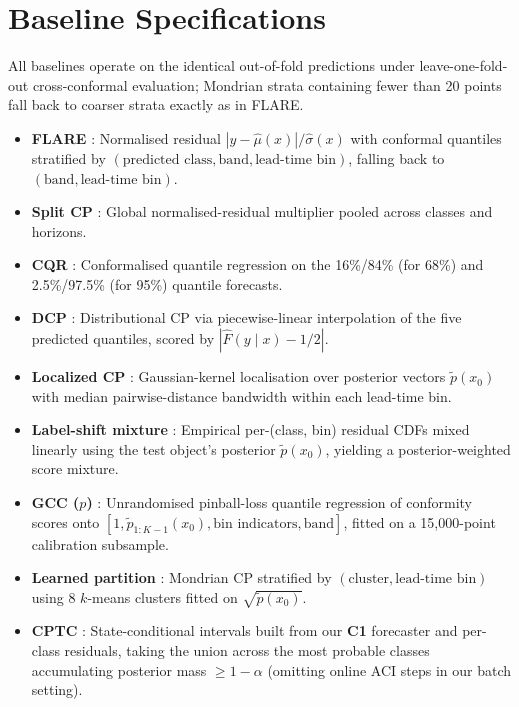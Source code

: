\section{Baseline Specifications}
\label{app:baselines}
All baselines operate on the identical out-of-fold predictions under leave-one-fold-out cross-conformal evaluation; Mondrian strata containing fewer than 20 points fall back to coarser strata exactly as in FLARE.
\begin{itemize}
\item \textbf{FLARE} \citep{sasli2026forecast,sasli2026flare}: Normalised residual $|y-\hat\mu(x)|/\hat\sigma(x)$ with conformal quantiles stratified by $(\text{predicted class},\text{band},\text{lead-time bin})$, falling back to $(\text{band},\text{lead-time bin})$.
\item \textbf{Split CP} \citep{lei2018distribution}: Global normalised-residual multiplier pooled across classes and horizons.
\item \textbf{CQR} \citep{romano2019conformalized}: Conformalised quantile regression on the 16\%/84\% (for 68\%) and 2.5\%/97.5\% (for 95\%) quantile forecasts.
\item \textbf{DCP} \citep{chernozhukov2021distributional}: Distributional CP via piecewise-linear interpolation of the five predicted quantiles, scored by $|\hat F(y\mid x)-1/2|$.
\item \textbf{Localized CP} \citep{guan2023localized}: Gaussian-kernel localisation over posterior vectors $\tilde p(x_0)$ with median pairwise-distance bandwidth within each lead-time bin.
\item \textbf{Label-shift mixture} \citep{podkopaev2021distribution}: Empirical per-(class, bin) residual CDFs mixed linearly using the test object's posterior $\tilde p(x_0)$, yielding a posterior-weighted score mixture.
\item \textbf{GCC ($p$)} \citep{gibbs2025conformal}: Unrandomised pinball-loss quantile regression of conformity scores onto $[1,\tilde p_{1:K-1}(x_0),\text{bin indicators},\text{band}]$, fitted on a 15,000-point calibration subsample.
\item \textbf{Learned partition} \citep{kiyani2024conformal}: Mondrian CP stratified by $(\text{cluster},\text{lead-time bin})$ using 8 $k$-means clusters fitted on $\sqrt{\tilde p(x_0)}$.
\item \textbf{CPTC} \citep{sun2025conformal}: State-conditional intervals built from our \textbf{C1} forecaster and per-class residuals, taking the union across the most probable classes accumulating posterior mass $\ge 1-\alpha$ (omitting online ACI steps in our batch setting).

\end{itemize}
